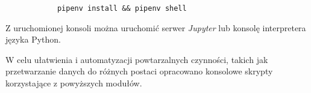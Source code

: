 {{        \begin{verbatim}
            pipenv install && pipenv shell
        \end{verbatim}

        Z uruchomionej konsoli można uruchomić serwer {\textit {Jupyter}} lub konsolę interpretera języka Python.

        W celu ułatwienia i automatyzacji powtarzalnych czynności, takich jak przetwarzanie danych do różnych postaci opracowano konsolowe skrypty korzystające z powyższych modułów.
    }
}